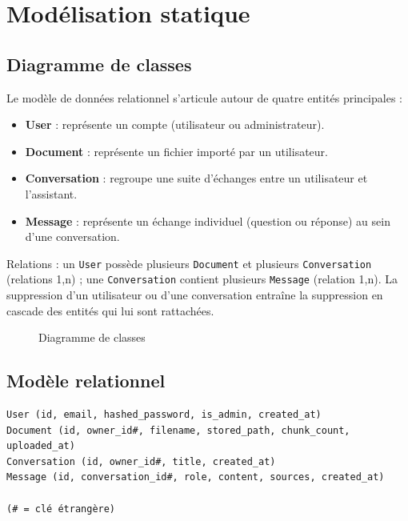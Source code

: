 \documentclass[12pt,a4paper]{report}
\newcommand{\note}[1]{\textit{[#1]}}
\begin{document}
\section{Modélisation statique}

\subsection{Diagramme de classes}
Le modèle de données relationnel s'articule autour de quatre entités principales :
\begin{itemize}
  \item \textbf{User} : représente un compte (utilisateur ou administrateur).
  \item \textbf{Document} : représente un fichier importé par un utilisateur.
  \item \textbf{Conversation} : regroupe une suite d'échanges entre un utilisateur et l'assistant.
  \item \textbf{Message} : représente un échange individuel (question ou réponse) au sein d'une conversation.
\end{itemize}

Relations : un \texttt{User} possède plusieurs \texttt{Document} et plusieurs \texttt{Conversation} (relations 1,n) ; une \texttt{Conversation} contient plusieurs \texttt{Message} (relation 1,n). La suppression d'un utilisateur ou d'une conversation entraîne la suppression en cascade des entités qui lui sont rattachées.

\begin{figure}[h]
\centering
\fbox{\parbox{10cm}{\centering \vspace{2cm} Diagramme de classes \\ \note{à réaliser} \vspace{2cm}}}
\caption{Diagramme de classes}
\end{figure}

\subsection{Modèle relationnel}
\begin{verbatim}
User (id, email, hashed_password, is_admin, created_at)
Document (id, owner_id#, filename, stored_path, chunk_count, uploaded_at)
Conversation (id, owner_id#, title, created_at)
Message (id, conversation_id#, role, content, sources, created_at)

(# = clé étrangère)
\end{verbatim}
\end{document}
